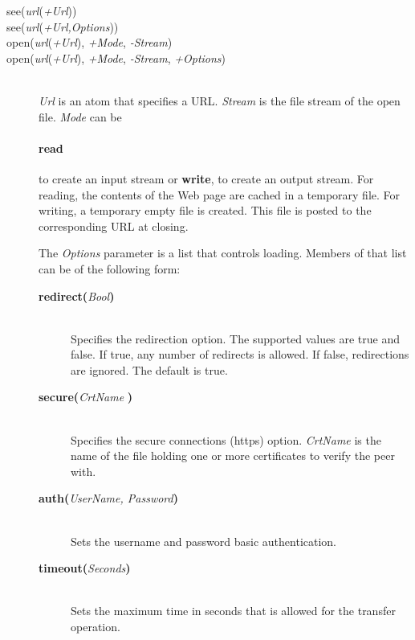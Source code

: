 \begin{description}

\item[see({\it url}({\it +Url}))]\mbox{}
\item[see({\it url}({\it +Url,Options}))]\mbox{}
\item[open({\it url}({\it +Url}), {\it +Mode}, {\it -Stream})]\mbox{}
\item[open({\it url}({\it +Url}), {\it +Mode}, {\it -Stream}, {\it +Options})]\mbox{}
  \\

{\it Url} is an atom that specifies a URL.
\emph{Stream} is the file stream of the open file.
{\it Mode} can be
\paragraph{read} to create an input stream or
{\bf write},  to create an output stream.
For reading, the contents of the Web page are cached in a temporary file.
For writing, a temporary empty file is created. This file is posted to the
corresponding URL at closing.

The {\it Options} parameter is a list that controls loading. Members of that list can be of the following form:

  \begin{description}
  \item[{\bf redirect}{\bf (}{\it Bool}{\bf )}]\mbox{}
    \\
    Specifies the redirection option. The supported values are true and
    false. If true, any number of redirects is allowed. If false,
    redirections are ignored.
    The default is true.

  \item[{\bf secure}{\bf (}{\it CrtName}{\bf
    )}]\mbox{}
    \\
    Specifies the secure connections (https) option. \emph{CrtName} is the name of the file holding one or more certificates to verify the peer with. 

  \item[{\bf auth}{\bf (}{\it UserName, \it Password}{\bf )}]\mbox{}\\Sets the username and password basic authentication.

  \item[{\bf timeout}{\bf (}{\it Seconds}{\bf )}]\mbox{}\\Sets the maximum time in seconds that is allowed for the transfer operation.


\end{description}
\end{description}
